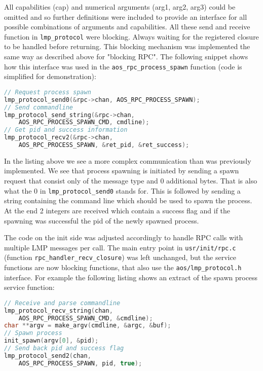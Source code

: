 All capabilities (cap) and numerical arguments (arg1, arg2, arg3) could be omitted and so further definitions were included to provide an interface for all possible combinations of arguments and capabilities. All these send and receive function in \verb|lmp_protocol| were blocking. Always waiting for the registered closure to be handled before returning. This blocking mechanism was implemented the same way as described above for "blocking RPC". The following snippet shows how this interface was used in the \verb|aos_rpc_process_spawn| function (code is simplified for demonstration):

\begin{lstlisting}[language=c, caption=Usage of aos/lmp\_protocol in aos\_rpc\_process\_spawn]
// Request process spawn
lmp_protocol_send0(&rpc->chan, AOS_RPC_PROCESS_SPAWN);
// Send commandline
lmp_protocol_send_string(&rpc->chan,
    AOS_RPC_PROCESS_SPAWN_CMD, cmdline);
// Get pid and success information
lmp_protocol_recv2(&rpc->chan,
    AOS_RPC_PROCESS_SPAWN, &ret_pid, &ret_success);
\end{lstlisting}

In the listing above we see a more complex communication than was previously implemented. We see that process spawning is initiated by sending a spawn request that consist only of the message type and 0 additional bytes. That is also what the 0 in \verb|lmp_protocol_send0| stands for. This is followed by sending a string containing the command line which should be used to spawn the process. At the end 2 integers are received which contain a success flag and if the spawning was successful the pid of the newly spawned process.

The code on the init side was adjusted accordingly to handle RPC calls with multiple LMP messages per call. The main entry point in \verb|usr/init/rpc.c| (function \verb|rpc_handler_recv_closure|) was left unchanged, but the service functions are now blocking functions, that also use the \verb|aos/lmp_protocol.h| interface.
For example the following listing shows an extract of the spawn process service function:

\begin{lstlisting}[language=c, caption=Usage of aos/lmp\_protocol in usr/init/rpc.c]
// Receive and parse commandline
lmp_protocol_recv_string(chan,
    AOS_RPC_PROCESS_SPAWN_CMD, &cmdline);
char **argv = make_argv(cmdline, &argc, &buf);
// Spawn process
init_spawn(argv[0], &pid);
// Send back pid and success flag
lmp_protocol_send2(chan,
    AOS_RPC_PROCESS_SPAWN, pid, true);
\end{lstlisting}

